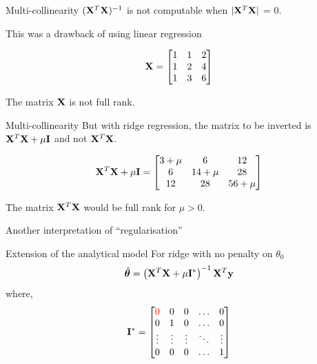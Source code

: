 \documentclass{beamer}
\begin{document}
\begin{frame}{Multi-collinearity}
$(\mathbf{X}^{T}\mathbf{X})^{-1}$ is not computable when $|\mathbf{X}^{T}\mathbf{X}|$ = 0.

This was a drawback of using linear regression

\begin{equation*}
\mathbf{X} = \begin{bmatrix}
1 & 1& 2\\
1 & 2& 4\\
1 & 3& 6\\
\end{bmatrix}
\end{equation*}

The matrix $\mathbf{X}$ is not full rank. 
\end{frame}

\begin{frame}{Multi-collinearity}
But with ridge regression, the matrix to be inverted is $\mathbf{X}^{T}\mathbf{X} + \mu \mathbf{I}$ and not $\mathbf{X}^{T}\mathbf{X}$.

\begin{equation*}
\mathbf{X}^T\mathbf{X} + \mu \mathbf{I} = \begin{bmatrix}
3+\mu & 6& 12\\
6 & 14+\mu & 28\\
12 & 28& 56+\mu \\
\end{bmatrix}
\end{equation*}

The matrix $\mathbf{X}^T\mathbf{X}$ would be full rank for $\mu>0$. 

\pause Another interpretation of ``regularisation''
\end{frame}


\begin{frame}{Extension of the analytical model}
For ridge with no penalty on $\theta_0$
$$
\hat{\boldsymbol{\theta}} = \left(\mathbf{X}^T\mathbf{X}+\mu \mathbf{I}^*\right)^{-1}\mathbf{X}^T\mathbf{y}
$$
where, $$\mathbf{I}^* = \begin{bmatrix}
    \color{red}0 & 0 & 0 & \dots  & 0 \\
    0 & 1& 0 & \dots  & 0\\
    \vdots & \vdots & \vdots & \ddots & \vdots \\
    0 & 0 & 0 & \dots  & 1
\end{bmatrix}$$
\end{frame}


%	


%	
\end{document}
